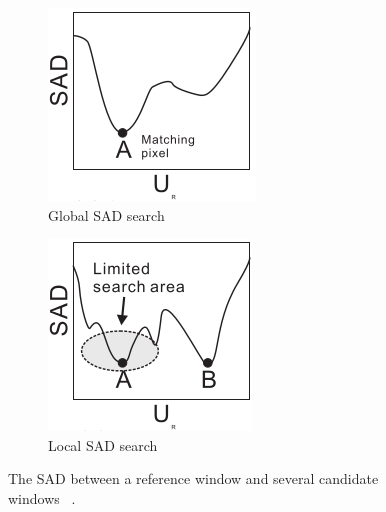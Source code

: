 \begin{figure}
\begin{center}
	\begin{subfigure}{0.4\textwidth}
		\includegraphics[width=\textwidth]{figures/sadGlobalGraph.png}
		\caption{Global SAD search}
		\label{fig:globalSAD}
	\end{subfigure}
	\begin{subfigure}{0.4\textwidth}
		\includegraphics[width=\textwidth]{figures/sadLocalGraph.png}
		\caption{Local SAD search}
		\label{fig:localSAD}
	\end{subfigure}
	\captionfonts
	\caption{The SAD between a reference window and several candidate windows ~\cite{sadParallel}.}
	\label{fig:sadGraphs}
\end{center}
\end{figure}

